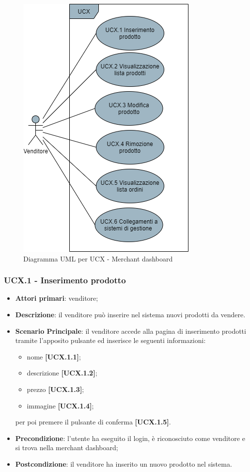 \begin{figure}[H]
\centering
\includegraphics[scale=0.6]{res/UseCase/Immagini/MerchantDashboard}
\caption{Diagramma UML per UCX - Merchant dashboard}
\end{figure}

\subsubsection{UCX.1 - Inserimento prodotto}
\begin{itemize}
\item \textbf{Attori primari}: venditore;
\item \textbf{Descrizione}: il venditore può inserire nel sistema nuovi prodotti da vendere.
\item \textbf{Scenario Principale}: il venditore accede alla pagina di inserimento prodotti tramite l'apposito pulsante ed inserisce le seguenti informazioni:
\begin{itemize}
	\item nome \textbf{[UCX.1.1]};
	\item descrizione \textbf{[UCX.1.2]};
	\item prezzo \textbf{[UCX.1.3]};
	\item immagine \textbf{[UCX.1.4]};
\end{itemize}
per poi premere il pulsante di conferma \textbf{[UCX.1.5]}.
\item \textbf{Precondizione}: l'utente ha eseguito il login, è riconosciuto come venditore e si trova nella merchant dashboard;
\item \textbf{Postcondizione}: il venditore ha inserito un nuovo prodotto nel sistema.
\end{itemize}

